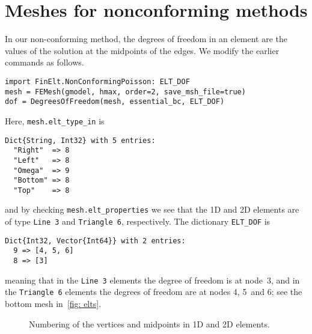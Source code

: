 \documentclass[a4paper,10pt]{article}
\begin{document}
\section{Meshes for nonconforming methods}
In our non-conforming method, the degrees of freedom in an element are the 
values of the solution at the midpoints of the edges.  We modify the earlier 
commands as follows.
\begin{lstlisting}
import FinElt.NonConformingPoisson: ELT_DOF
mesh = FEMesh(gmodel, hmax, order=2, save_msh_file=true)
dof = DegreesOfFreedom(mesh, essential_bc, ELT_DOF)
\end{lstlisting}
Here, \texttt{mesh.elt\_type\_in} is 
\begin{lstlisting}
Dict{String, Int32} with 5 entries:
  "Right"  => 8
  "Left"   => 8
  "Omega"  => 9
  "Bottom" => 8
  "Top"    => 8
\end{lstlisting}
and by checking \texttt{mesh.elt\_properties} we see that the
1D and 2D elements are of type \texttt{Line 3} and \texttt{Triangle 6}, 
respectively. The dictionary \texttt{ELT\_DOF} is
\begin{lstlisting}
Dict{Int32, Vector{Int64}} with 2 entries:
  9 => [4, 5, 6]
  8 => [3]
\end{lstlisting}
meaning that in the \texttt{Line 3} elements the degree of freedom is at node~3,
and in the \texttt{Triangle 6} elements the degrees of freedom are at nodes 4, 
5~and 6; see the bottom mesh in~\cref{fig: elts}.

\begin{figure}
\caption{Numbering of the vertices and midpoints in 1D and 2D 
elements.}\label{fig: vertex midpt}
\begin{center}
\end{center}
\end{figure}
\end{document}
